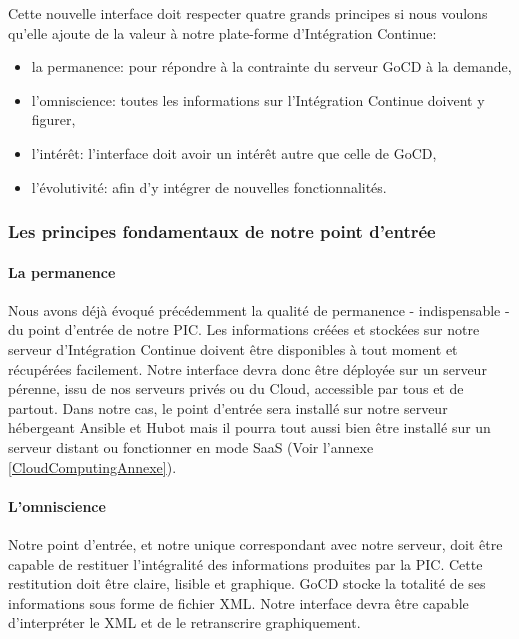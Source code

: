       Cette nouvelle interface doit respecter quatre grands principes si nous voulons qu'elle ajoute de la valeur à notre plate-forme d'Intégration Continue:\\

      \begin{itemize}
        \item la permanence: pour répondre à la contrainte du serveur GoCD à la demande,
        \item l'omniscience: toutes les informations sur l'Intégration Continue doivent y figurer,
        \item l'intérêt: l'interface doit avoir un intérêt autre que celle de GoCD,
        \item l'évolutivité: afin d'y intégrer de nouvelles fonctionnalités.\\
      \end{itemize}

        \subsubsection{Les principes fondamentaux de notre point d'entrée}
          \paragraph{La permanence} Nous avons déjà évoqué précédemment la qualité de permanence - indispensable - du point d'entrée de notre PIC. Les informations créées et stockées sur notre serveur d'Intégration Continue doivent être disponibles à tout moment et récupérées facilement. Notre interface devra donc être déployée sur un serveur pérenne, issu de nos serveurs privés ou du Cloud, accessible par tous et de partout.
          Dans notre cas, le point d'entrée sera installé sur notre serveur hébergeant Ansible et Hubot mais il pourra tout aussi bien être installé sur un serveur distant ou fonctionner en mode SaaS (Voir l'annexe \ref{CloudComputingAnnexe}).

          \paragraph{L'omniscience} Notre point d'entrée, et notre unique correspondant avec notre serveur, doit être capable de restituer l'intégralité des informations produites par la PIC. Cette restitution doit être claire, lisible et graphique.
          GoCD stocke la totalité de ses informations sous forme de fichier XML. Notre interface devra être capable d'interpréter le XML et de le retranscrire graphiquement.

